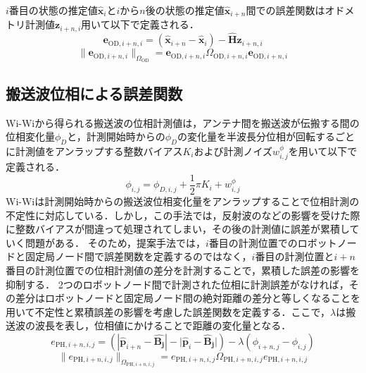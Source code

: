 \documentclass[a4jsme]{jsmepaper}
\begin{document}
$i$番目の状態の推定値$\mathbf{\hat{x}}_i$と$i$から$n$後の状態の推定値$\mathbf{\hat{x}}_{i+n}$間での誤差関数はオドメトリ計測値$\mathbf{z}_{i+n,i}$用いて以下で定義される．
\begin{equation}
    \mathbf{e}_{\mathrm{OD},i+n,i} = \left(\mathbf{\hat{x}}_{i+n}-\mathbf{\hat{x}}_{i}\right)-\mathbf{\hat{H}}\mathbf{z}_{i+n,i}
\end{equation}
\begin{equation}
    \|\mathbf{e}_{\mathrm{OD},i+n,i}\|_{\Omega_{\mathrm{OD}}} = \mathbf{e}_{\mathrm{OD},i+n,i}{\Omega}_{\mathrm{OD},i+n,i}\mathbf{e}_{\mathrm{OD},i+n,i}
\end{equation}

\subsection{搬送波位相による誤差関数}
Wi-Wiから得られる搬送波の位相計測値は，アンテナ間を搬送波が伝搬する間の位相変化量$\phi_D$と，計測開始時からの$\phi_D$の変化量を半波長分位相が回転するごとに計測値をアンラップする整数バイアス$K_i$および計測ノイズ$w^\phi_{i,j}$を用いて以下で定義される\cite{Peng2017}．
\begin{equation}
     \phi_{i,j}=\phi_{D,i,j}+\frac{1}{2}{\pi}K_i+w^\phi_{i,j}
\end{equation}
Wi-Wiは計測開始時からの搬送波位相変化量をアンラップすることで位相計測の不定性に対応している．しかし，この手法では，反射波のなどの影響を受けた際に整数バイアスが間違って処理されてしまい，その後の計測値に誤差が累積していく問題がある．
そのため，提案手法では，$i$番目の計測位置でのロボットノードと固定局ノード間で誤差関数を定義するのではなく，$i$番目の計測位置と$i+n$番目の計測位置での位相計測値の差分を計測することで，累積した誤差の影響を抑制する．
2つのロボットノード間で計測された位相に計測誤差がなければ，その差分はロボットノードと固定局ノード間の絶対距離の差分と等しくなることを用いて不定性と累積誤差の影響を考慮した誤差関数を定義する．ここで，$\lambda$は搬送波の波長を表し，位相値にかけることで距離の変化量となる．
\begin{equation}
    e_{\mathrm{PH},i+n,i,j} = \left(|\mathbf{\hat{p}}_{i+n}-\mathbf{\hat{B_j}}|-|\mathbf{\hat{p}}_{i}-\mathbf{\hat{B}_j|}\right)-\lambda(\phi_{i+n,j}-\phi_{i,j})
\end{equation}
\begin{equation}    
    \|e_{\mathrm{PH},i+n,i,j}\|_{\Omega_{\mathrm{PH},i+n,i,j}} = e_{\mathrm{PH},i+n,i,j}\Omega_{\mathrm{PH},i+n,i,j}e_{\mathrm{PH},i+n,i,j}
\end{equation}
\end{document}
